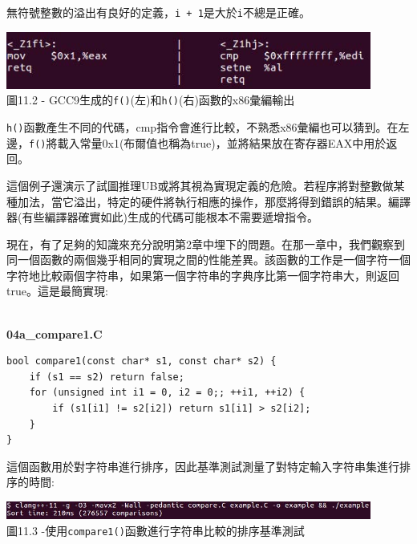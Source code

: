 無符號整數的溢出有良好的定義，\texttt{i + 1}是大於\texttt{i}不總是正確。

\begin{center}
\includegraphics[width=0.9\textwidth]{content/3/chapter11/images/2.jpg}\\
圖11.2 - GCC9生成的\texttt{f()}(左)和\texttt{h()}(右)函數的x86彙編輸出
\end{center}

\texttt{h()}函數產生不同的代碼，cmp指令會進行比較，不熟悉x86彙編也可以猜到。在左邊，\texttt{f()}將載入常量0x1(布爾值也稱為true)，並將結果放在寄存器EAX中用於返回。 

這個例子還演示了試圖推理UB或將其視為實現定義的危險。若程序將對整數做某種加法，當它溢出，特定的硬件將執行相應的操作，那麼將得到錯誤的結果。編譯器(有些編譯器確實如此)生成的代碼可能根本不需要遞增指令。

現在，有了足夠的知識來充分說明第2章中埋下的問題。在那一章中，我們觀察到同一個函數的兩個幾乎相同的實現之間的性能差異。該函數的工作是一個字符一個字符地比較兩個字符串，如果第一個字符串的字典序比第一個字符串大，則返回true。這是最簡實現:

\hspace*{\fill} \\ %
\noindent
\textbf{04a\_compare1.C}
\begin{lstlisting}[style=styleCXX]
bool compare1(const char* s1, const char* s2) {
	if (s1 == s2) return false;
	for (unsigned int i1 = 0, i2 = 0;; ++i1, ++i2) {
		if (s1[i1] != s2[i2]) return s1[i1] > s2[i2];
	}
}
\end{lstlisting}

這個函數用於對字符串進行排序，因此基準測試測量了對特定輸入字符串集進行排序的時間:

\begin{center}
\includegraphics[width=0.9\textwidth]{content/3/chapter11/images/3.jpg}\\
圖11.3 -使用\texttt{compare1()}函數進行字符串比較的排序基準測試
\end{center}

